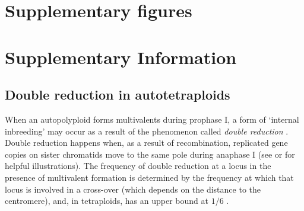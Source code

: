 \documentclass[unnumsec,webpdf,modern,large]{_oup-authoring-template}
\theoremstyle{thmstyleone}%
\theoremstyle{thmstyletwo}%
\theoremstyle{thmstylethree}%
\begin{document}
\onecolumn %

\section{Supplementary figures}

\section{Supplementary Information}

\subsection*{Double reduction in autotetraploids}

When an autopolyploid forms multivalents during prophase I, a form of `internal
inbreeding' may occur as a result of the phenomenon called \emph{double
reduction} \citep{huang2019}.
Double reduction happens when, as a result of recombination, replicated gene
copies on sister chromatids move to the same pole during anaphase I (see
\cite{stift2010} or \cite{huang2019} for helpful illustrations).
The frequency of double reduction at a locus in the presence of multivalent
formation is determined by the frequency at which that locus is involved in a
cross-over (which depends on the distance to the centromere), and, in
tetraploids, has an upper bound at \(1/6\) \citep{mather1935,stift2010}.
 
\end{document}
